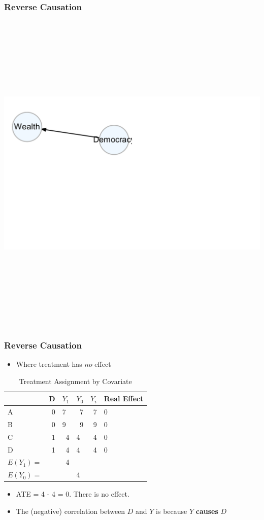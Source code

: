 \documentclass[xcolor=x11names,compress]{beamer}\usepackage[]{graphicx}\usepackage[]{color}
\newenvironment{knitrout}{}{} %
\renewcommand{\(}{\begin{columns}}
\renewcommand{\)}{\end{columns}}
\newcommand{\<}[1]{\begin{column}{#1}}
\renewcommand{\>}{\end{column}}
\begin{document}
\begin{frame}
\frametitle{Reverse Causation}
\begin{knitrout}
\color{fgcolor}

{\centering \includegraphics[width=600,height=600]{figure/unnamed-chunk-7-1} 

}



\end{knitrout}
\end{frame}

\begin{frame}
\frametitle{Reverse Causation}
\begin{itemize}
\item Where treatment has $no$ effect
\end{itemize}
\begin{table}[htbp]
  \centering
  \caption{Treatment Assignment by Covariate}
    \begin{tabular}{|l|r|r|l|r|l|}
    \hline
          &  \multicolumn{1}{l|}{D} & \multicolumn{1}{l|}{$Y_1$} & $Y_0$  & \multicolumn{1}{l|}{$Y_i$} & Real Effect \bigstrut\\
    \hline
    A     & 0     & \multicolumn{1}{l|}{7} & \multicolumn{1}{r|}{\cellcolor{teal}7} & 7     & 0 \bigstrut\\
    \hline
    B     & 0     & \multicolumn{1}{l|}{9} & \multicolumn{1}{r|}{\cellcolor{teal}9} & 9     & 0 \bigstrut\\
    \hline
    C     &  1     & \cellcolor{teal}4     & 4     & 4     & 0 \bigstrut\\
    \hline
    D     & 1     & \cellcolor{teal}4     & 4     & 4     & 0 \bigstrut\\
    \hline\pause
    $E(Y_1)=$ & & 4 & & \bigstrut\\
    \hline
    $E(Y_0)=$ &  & & 4 & \bigstrut\\
    \hline
    \end{tabular}%
  \label{tab:addlabel}%
\end{table}%
\begin{itemize}
\pause
\item ATE = 4 - 4 = 0. There is no effect. 
\item The (negative) correlation between $D$ and $Y$ is because $Y$ \textbf{causes} $D$
\end{itemize}
\end{frame}
\end{document}
